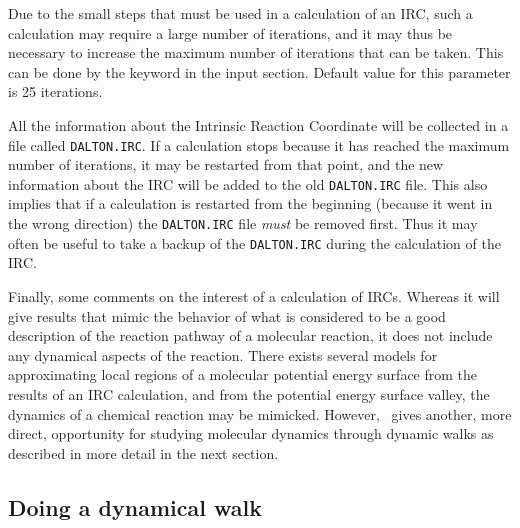 Due to the small steps that must be used in a calculation of an IRC,
such a calculation may require a large number of
iterations, and it
may thus be necessary to increase the maximum number of iterations
that can be taken.  This can be done by
the keyword  in the  input
section. Default value for this parameter is 25 iterations.

All the information about the Intrinsic Reaction Coordinate will be
collected in a file called \texttt{DALTON.IRC}. If a
calculation stops
because it has reached the maximum number of iterations, it may be
restarted from that point, and the new information about the IRC will
be added to the old \texttt{DALTON.IRC} file. This also implies that if a
calculation is restarted from the beginning (because it went in the
wrong direction) the \texttt{DALTON.IRC} file {\em must\/} be removed
first. Thus it may often be useful to take a backup of the
\texttt{DALTON.IRC} during the calculation of the IRC.

Finally, some comments on the interest of a calculation of IRCs.
Whereas it will give results that mimic the behavior of what is
considered to be a good description of the reaction
pathway of a
molecular reaction, it does not include any dynamical aspects of the
reaction. There exists several models for approximating local regions of a
molecular potential energy surface from the results of an IRC
calculation, and from the
potential energy surface valley, the dynamics of a
chemical reaction may be
mimicked. However, \siraba\ gives another, more direct, opportunity
for studying molecular dynamics through dynamic walks as described in
more detail in the next section.

\subsection{Doing a dynamical walk}\label{sec:dynamic}

\begin{center}
\end{center}

